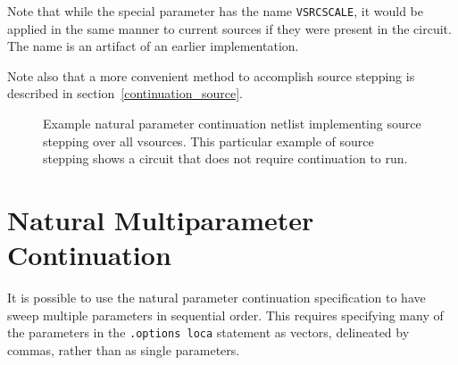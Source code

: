 Note that while the special parameter has the name \texttt{VSRCSCALE}, 
it would be applied in the same manner to current sources if they were
present in the circuit.  The name is an artifact of an earlier 
implementation.

Note also that a more convenient method to accomplish source stepping is described in 
section~\ref{continuation_source}.

\begin{figure}[htbp]
\begin{centering}
\caption[Example natural parameter continuation netlist]{Example natural parameter continuation netlist implementing source stepping over all vsources. This particular example of source stepping shows a circuit that does not require continuation to run.\label{Continuation_Netlist_sourceStepping2}}
\end{centering}
\end{figure}

\newpage 
\section{Natural Multiparameter Continuation} 
\label{continuation_natural_multiparam}

It is possible to use the natural parameter continuation specification to  
have \Xyce{} sweep multiple parameters in sequential order.  This 
requires specifying many of the parameters in the \texttt{.options loca} statement as vectors, delineated by commas, rather than as single parameters.  

